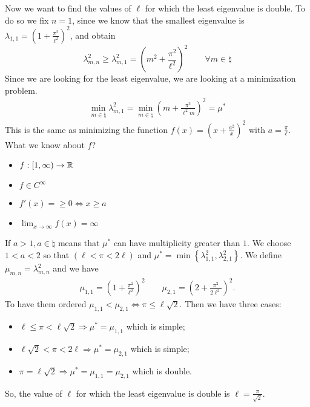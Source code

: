 Now we want to find the values of \(\ell\) for which the least eigenvalue is double. To do so we fix \(n = 1\), since we know that the smallest eigenvalue is \(\lambda_{1,1} = \left(1 + \frac{\pi^2}{\ell^2}\right)^2\), and obtain
\[
    \lambda_{m, n}^2 \geq \lambda_{m, 1}^2 = \left( m^2 + \frac{\pi^2}{\ell^2} \right)^2 \qquad \forall m \in \natural
\]
Since we are looking for the least eigenvalue, we are looking at a minimization problem. 
\[
    \begin{split}
        \min_{m \in \natural} \lambda_{m, 1}^2 = \min_{m \in \natural} \left( m + \frac{\pi^2}{\ell^2 m} \right)^2 = \mu^*
    \end{split}
\]
This is the same as minimizing the function \(f(x) = (x + \frac{a^2}{x})^2\) with \(a = \frac{\pi}{\ell}\).
What we know about \(f\)?
\begin{itemize}
    \item \(f : [1, \infty) \to \mathbb{R}\)
    \item \(f \in C^\infty\)
    \item \(f'(x) = \geq 0 \iff x \geq a\)
    \item \(\lim_{x \to \infty} f(x) = \infty\)
\end{itemize}
If \(a > 1, a \in \natural\) means that \(\mu^*\) can have multiplicity greater than \(1\). We choose \(1 < a < 2\) so that \((\ell < \pi < 2\ell)\) and \(\mu^* = \min\left\{\lambda_{1,1}^2, \lambda_{2,1}^2\right\}\). We define \(\mu_{m,n} = \lambda_{m,n}^2\) and we have 
\[
    \begin{split}
        \mu_{1,1} = \left(1 + \frac{\pi^2}{\ell^2}\right)^2 \qquad \mu_{2,1} = \left(2 + \frac{\pi^2}{2 \ell^2}\right)^2.
    \end{split}
\]
To have them ordered \(\mu_{1,1} < \mu_{2,1} \iff \pi \leq \ell \sqrt{2}\). Then we have three cases:
\begin{itemize}
    \item \(\ell \leq \pi < \ell \sqrt{2} \Rightarrow \mu^* = \mu_{1,1}\) which is simple;
    \item \(\ell \sqrt{2} < \pi < 2\ell \Rightarrow \mu^* = \mu_{2,1}\) which is simple;
    \item \(\pi = \ell \sqrt{2} \Rightarrow \mu^* = \mu_{1,1} = \mu_{2,1}\) which is double.
\end{itemize}
So, the value of \(\ell\) for which the least eigenvalue is double is \(\ell = \frac{\pi}{\sqrt{2}}\).

\newpage
